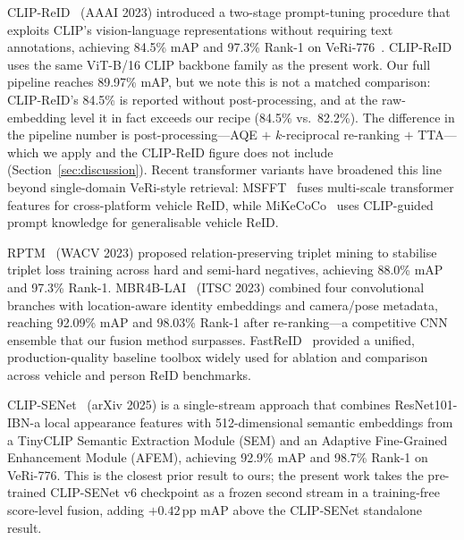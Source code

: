 \documentclass[10pt,a4paper]{article}
\begin{document}
CLIP-ReID~\cite{li2023clipreid} (AAAI 2023) introduced a two-stage
prompt-tuning procedure that exploits CLIP's vision-language representations
without requiring text annotations, achieving 84.5\% mAP and 97.3\% Rank-1 on
VeRi-776~\cite{opencodepapers2024veri}. CLIP-ReID uses the same ViT-B/16 CLIP
backbone family as the present work. Our full pipeline reaches 89.97\% mAP, but
we note this is not a matched comparison: CLIP-ReID's 84.5\% is reported
without post-processing, and at the raw-embedding level it in fact exceeds our
recipe (84.5\% vs.\ 82.2\%). The difference in the pipeline number is
post-processing---AQE $+$ $k$-reciprocal re-ranking $+$ TTA---which we apply
and the CLIP-ReID figure does not include (Section~\ref{sec:discussion}).
Recent transformer variants have broadened this line beyond single-domain
VeRi-style retrieval: MSFFT~\cite{holla2024msfft} fuses multi-scale transformer
features for cross-platform vehicle ReID, while
MiKeCoCo~\cite{kuang2025mikecoco} uses CLIP-guided prompt knowledge for
generalisable vehicle ReID.

RPTM~\cite{ghosh2023rptm} (WACV 2023) proposed relation-preserving triplet
mining to stabilise triplet loss training across hard and semi-hard negatives,
achieving 88.0\% mAP and 97.3\% Rank-1. MBR4B-LAI~\cite{luo2023mbr4b} (ITSC
2023) combined four convolutional branches with location-aware identity
embeddings and camera/pose metadata, reaching 92.09\% mAP and 98.03\% Rank-1
after re-ranking---a competitive CNN ensemble that our fusion method surpasses.
FastReID~\cite{wang2020fastreid} provided a unified, production-quality
baseline toolbox widely used for ablation and comparison across vehicle and
person ReID benchmarks.

CLIP-SENet~\cite{lu2025clipsenet} (arXiv 2025) is a single-stream approach that
combines ResNet101-IBN-a local appearance features with 512-dimensional
semantic embeddings from a TinyCLIP Semantic Extraction Module (SEM) and an
Adaptive Fine-Grained Enhancement Module (AFEM), achieving 92.9\% mAP and
98.7\% Rank-1 on VeRi-776. This is the closest prior result to ours; the
present work takes the pre-trained CLIP-SENet v6 checkpoint as a frozen second
stream in a training-free score-level fusion, adding $+0.42$\,pp mAP above the
CLIP-SENet standalone result.
\end{document}
